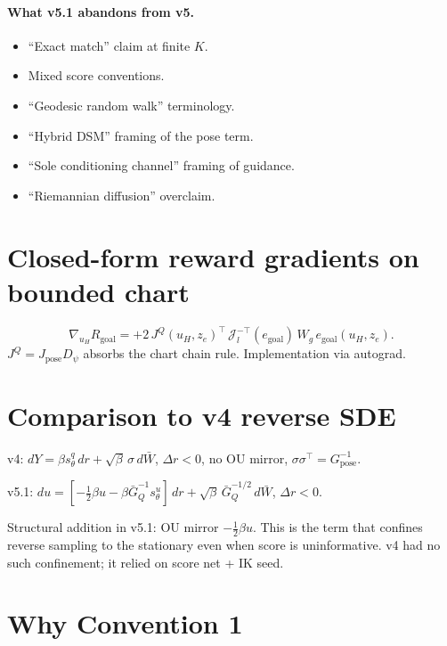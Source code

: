 \documentclass[11pt,a4paper]{article}
\newcommand{\Jpose}{J_{\text{pose}}}
\newcommand{\JQ}{J^Q}
\newcommand{\GQbar}{\bar G_Q}
\newcommand{\psimap}{\psi}
\newcommand{\Dpsi}{D_\psimap}
\begin{document}
\paragraph{What v5.1 abandons from v5.}
\begin{itemize}[noitemsep]
    \item ``Exact match'' claim at finite $K$.
    \item Mixed score conventions.
    \item ``Geodesic random walk'' terminology.
    \item ``Hybrid DSM'' framing of the pose term.
    \item ``Sole conditioning channel'' framing of guidance.
    \item ``Riemannian diffusion'' overclaim.
\end{itemize}

\appendix

\section{Closed-form reward gradients on bounded chart}

\begin{equation}
\nabla_{u_H} R_\text{goal} = +2\, \JQ(u_H, z_e)^\top\, \mathcal{J}_l^{-\top}(e_\text{goal})\, W_g\, e_\text{goal}(u_H, z_e).
\end{equation}
$\JQ = \Jpose \Dpsi$ absorbs the chart chain rule. Implementation via autograd.

\section{Comparison to v4 reverse SDE}

v4: $dY = \beta s_\theta^q\, dr + \sqrt{\beta}\, \sigma\, d\bar W$, $\Delta r < 0$, no OU mirror, $\sigma\sigma^\top = G_\text{pose}^{-1}$.

v5.1: $du = [-\tfrac{1}{2}\beta u - \beta \GQbar^{-1} s_\theta^u]\, dr + \sqrt{\beta}\, \GQbar^{-1/2}\, d\bar W$, $\Delta r < 0$.

Structural addition in v5.1: OU mirror $-\tfrac{1}{2}\beta u$. This is the term that confines reverse sampling to the stationary even when score is uninformative. v4 had no such confinement; it relied on score net + IK seed.

\section{Why Convention 1}
\end{document}
